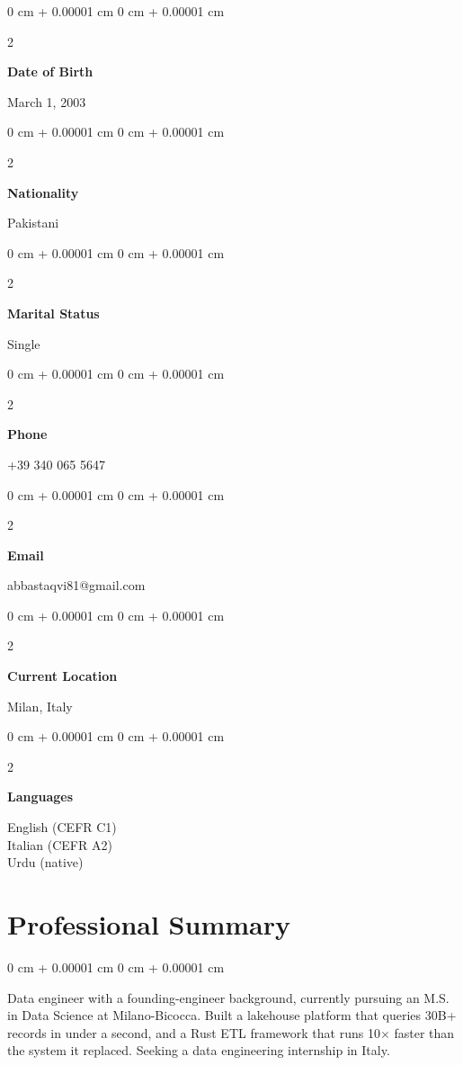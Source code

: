 \documentclass[10pt, letterpaper]{article}
\newenvironment{onecolentry}{
    \begin{adjustwidth}{
        0 cm + 0.00001 cm
    }{
        0 cm + 0.00001 cm
    }
}{
    \end{adjustwidth}
} %
\newenvironment{twocolentry}[2][]{
    \onecolentry
    \def\secondColumn{#2}
    \setcolumnwidth{\fill, 4.5 cm}
    \begin{paracol}{2}
}{
    \switchcolumn \raggedleft \secondColumn
    \end{paracol}
    \endonecolentry
} %
\begin{document}
\begin{twocolentry}{March 1, 2003}
    \textbf{Date of Birth}
\end{twocolentry}

\vspace{0.2 cm}

\begin{twocolentry}{Pakistani}
    \textbf{Nationality}
\end{twocolentry}

\vspace{0.2 cm}

\begin{twocolentry}{Single}
    \textbf{Marital Status}
\end{twocolentry}

\vspace{0.2 cm}

\begin{twocolentry}{+39 340 065 5647}
    \textbf{Phone}
\end{twocolentry}

\vspace{0.2 cm}

\begin{twocolentry}{abbastaqvi81@gmail.com}
    \textbf{Email}
\end{twocolentry}

\vspace{0.2 cm}

\begin{twocolentry}{Milan, Italy}
    \textbf{Current Location}
\end{twocolentry}

\vspace{0.2 cm}

\begin{twocolentry}{English (CEFR C1) \\ Italian (CEFR A2) \\ Urdu (native)}
    \textbf{Languages}
\end{twocolentry}

\section{Professional Summary}
\begin{onecolentry}
    Data engineer with a founding-engineer background, currently pursuing an M.S. in Data Science at Milano-Bicocca. Built a lakehouse platform that queries 30B+ records in under a second, and a Rust ETL framework that runs 10$\times$ faster than the system it replaced. Seeking a data engineering internship in Italy.
\end{onecolentry}
\end{document}
